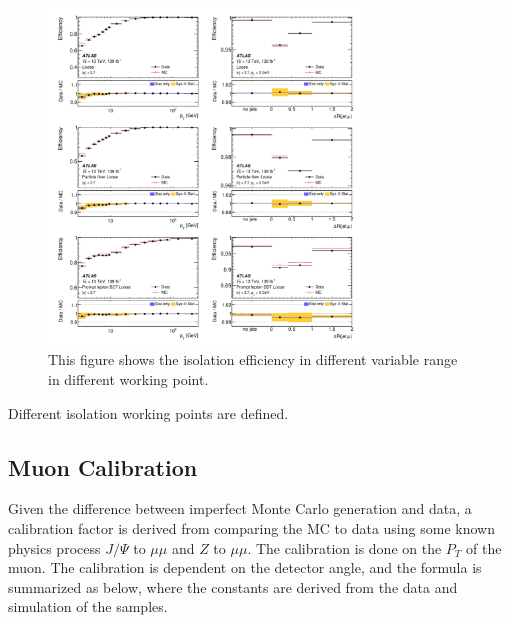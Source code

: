 
\begin{figure}[!htb]
    \begin{center}
        \includegraphics[width=0.75\textwidth]{figures/common_ana/IsolationEff1}
        \caption{
            This figure shows the isolation efficiency in different variable range in different working point\cite{Aad:2746302}.
        }
        \label{fig:isolationWP}
    \end{center}
\end{figure}

Different isolation working points are defined. 


\subsection{Muon Calibration}
Given the difference between imperfect Monte Carlo generation and data, a calibration factor is derived from comparing the MC to data using some known physics process $J/\Psi$ to $\mu \mu$ and $Z$ to $\mu \mu$. The calibration is done on the $P_{T}$ of the muon. 
The calibration is dependent on the detector angle, and the formula is summarized as below, where the constants are derived from the data and simulation of the samples.

